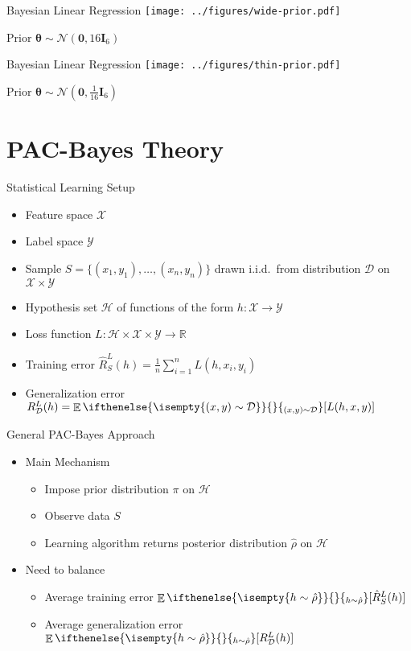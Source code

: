 \documentclass[aspectratio=169]{beamer}
\DeclareMathOperator*{\EvOp}{\mathbb{E}}
\newcommand{\CD}{\mathcal{D}}
\newcommand{\CH}{\mathcal{H}}
\newcommand{\CX}{\mathcal{X}}
\newcommand{\CY}{\mathcal{Y}}
\newcommand{\RR}{\mathbb{R}}
\newcommand*{\Ev}[2][]{%
  \mathchoice{%
    \EvOp\ifthenelse{\isempty{#1}}{}{_{#1}}\left[#2\right]%
  }{%
    \EvOp\ifthenelse{\isempty{#1}}{}{_{#1}}[#2]%
  }{%
    \EvOp\ifthenelse{\isempty{#1}}{}{_{#1}}[#2]%
  }{%
    \EvOp\ifthenelse{\isempty{#1}}{}{_{#1}}[#2]%
  }%
}
\begin{document}
\begin{frame}{Bayesian Linear Regression}
  \centering
  \texttt{[image: ../figures/wide-prior.pdf]}

  Prior $\bm{\theta} \sim \mathcal{N}(\bm{0}, 16 \mathbf{I}_6)$
\end{frame}

\begin{frame}{Bayesian Linear Regression}
  \centering
  \texttt{[image: ../figures/thin-prior.pdf]}

  Prior $\bm{\theta} \sim \mathcal{N}(\bm{0}, \frac{1}{16} \mathbf{I}_6)$
\end{frame}

\section{PAC-Bayes Theory}

\begin{frame}{Statistical Learning Setup}
  \begin{itemize}
    \item
      Feature space $\CX$
    \item
      Label space $\CY$
    \item
      Sample $S = \{(x_1, y_1), \ldots, (x_n, y_n)\}$ drawn i.i.d.\ from
      distribution $\CD$ on $\CX \times \CY$
    \item
      Hypothesis set $\CH$ of functions of the form $h : \CX \to \CY$
    \item
      Loss function $L : \CH \times \CX \times \CY \to \RR$
    \item
      Training error $\hat{R}_S^L(h) = \frac{1}{n} \sum_{i = 1}^n L(h, x_i,
      y_i)$
    \item
      Generalization error $R_\CD^L(h) = \Ev[(x, y) \sim \CD]{L(h, x, y)}$
  \end{itemize}
\end{frame}

\begin{frame}{General PAC-Bayes Approach}
  \begin{itemize}
    \item
      Main Mechanism
      \begin{itemize}
        \item
          Impose prior distribution $\pi$ on $\CH$
        \item
          Observe data $S$
        \item
          Learning algorithm returns posterior distribution $\hat{\rho}$ on $\CH$
      \end{itemize}
    \item
      Need to balance
      \begin{itemize}
        \item
          Average training error $\Ev[h \sim \hat{\rho}]{\hat{R}_S^L(h)}$
        \item
          Average generalization error $\Ev[h \sim \hat{\rho}]{R_\CD^L(h)}$
      \end{itemize}
  \end{itemize}
\end{frame}
\end{document}
